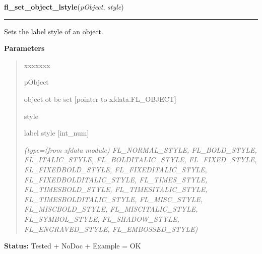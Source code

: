 \hspace{.8\funcindent}\begin{boxedminipage}{\funcwidth}

    \raggedright \textbf{fl\_set\_object\_lstyle}(\textit{pObject}, \textit{style})

    \vspace{-1.5ex}

    \rule{\textwidth}{0.5\fboxrule}
\setlength{\parskip}{2ex}
    Sets the label style of an object.

\setlength{\parskip}{1ex}
      \textbf{Parameters}
      \vspace{-1ex}

      \begin{quote}
        \begin{Ventry}{xxxxxxx}

          \item[pObject]

          object ot be set [pointer to xfdata.FL\_OBJECT]

          \item[style]

          label style [int\_num]

            {\it (type=(from xfdata module) FL\_NORMAL\_STYLE, FL\_BOLD\_STYLE, FL\_ITALIC\_STYLE,
FL\_BOLDITALIC\_STYLE, FL\_FIXED\_STYLE, FL\_FIXEDBOLD\_STYLE, 
FL\_FIXEDITALIC\_STYLE, FL\_FIXEDBOLDITALIC\_STYLE, FL\_TIMES\_STYLE, 
FL\_TIMESBOLD\_STYLE, FL\_TIMESITALIC\_STYLE, FL\_TIMESBOLDITALIC\_STYLE, 
FL\_MISC\_STYLE, FL\_MISCBOLD\_STYLE, FL\_MISCITALIC\_STYLE, 
FL\_SYMBOL\_STYLE, FL\_SHADOW\_STYLE, FL\_ENGRAVED\_STYLE, 
FL\_EMBOSSED\_STYLE)}

        \end{Ventry}

      \end{quote}

\textbf{Status:} Tested + NoDoc + Example = OK



    \end{boxedminipage}

    \label{xformslib:library:fl_get_object_lstyle}

    \vspace{0.5ex}

